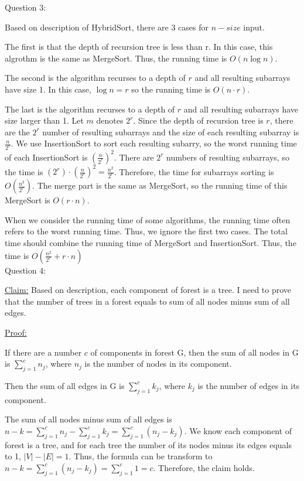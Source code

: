 \documentclass[12pt]{article}
\begin{document}
\pagebreak
\large Question 3: \vspace{5mm} \par
\normalsize 
\setlength{\baselineskip}{8mm}
Based on description of HybridSort, there are 3 cases for $n-size$ input.\par 
The first is that the depth of recursion tree is less than r. In this case, this algrothm is the same as MergeSort. Thus, the running time is $O(n\log{}{n})$. \par
The second is the algorithm recurses to a depth of $r$ and all resulting subarrays have size 1. In this case, $\log{}{n} = r$ so the running time is $O(n \cdot r)$. \par
The last is the algorithm recurses to a depth of $r$ and all resulting subarrays have size larger than 1. 
Let $m$ denotes $2^r$.
Since the depth of recursion tree is $r$,  there are the $2^r$ number of resulting subarrays and the size of each resulting subarray is $\frac{n}{2^r}$.
We use InsertionSort to sort each resulting subarry, so the worst running time of each InsertionSort is $(\frac{n}{2^r})^2$.
There are $2^r$ numbers of  resulting subarrays, so the time is $(2^r) \cdot (\frac{n}{2^r})^2 = \frac{n^2}{2^r} $. Therefore, the time for subarrays sorting is $O(\frac{n^2}{2^r})$. 
The merge part is the same as MergeSort, so the running time of this MergeSort is $O(r \cdot n)$.  \par
When we consider the running time of some algorithms, the running time often refers to the worst running time. Thus, we ignore the first two cases.
The total time should combine the running time of MergeSort and InsertionSort. Thus, the time is $O(\frac{n^2}{2^r} + r \cdot n)$\\


\pagebreak
\large Question 4: \vspace{5mm}\\
\normalsize 
\setlength{\baselineskip}{8mm}

\underline{Claim:} Based on description, each component of forest is a tree. I need to prove that the number of trees in a forest equals to sum of all nodes minus sum of all edges. \vspace{5mm}\par
\underline{Proof:} \par
If there are a number $c$ of components in forest G, then the sum of all nodes in G is $\sum_{j=1}^{c} {n_j} $, where ${n_j}$ is the number of nodes in its component. \par 
Then the sum of all edges in G is $\sum_{j=1}^{c} {k_j} $, where ${k_j}$ is the number of edges in its component. \par
The sum of all nodes minus sum of all edges is $ n - k = \sum_{j=1}^{c} {n_j} - \sum_{j=1}^{c} {k_j}  = \sum_{j=1}^{c} {(n_j - k_j)}$. 
We know each component of forest is a tree, and for each tree the number of its nodes minus its edges equals to 1, $|V| - |E| = 1$.
Thus, the formula can be transform to $n - k = \sum_{j=1}^{c} {(n_j - k_j)} = \sum_{j=1}^{c} 1 = c$.
Therefore, the claim holds.
\end{document}
